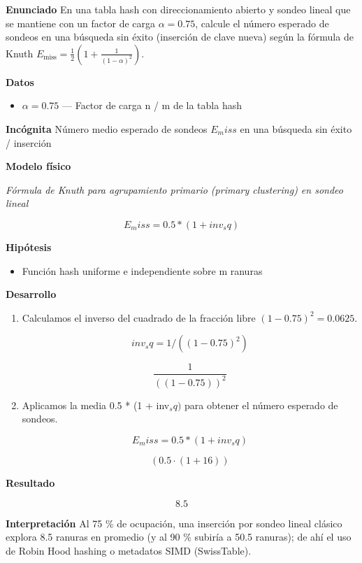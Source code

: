 \documentclass{book}
\begin{document}
\begin{tcolorbox}[title={Problema resuelto}, studiumworked, breakable]

\noindent\textbf{Enunciado}
En una tabla hash con direccionamiento abierto y sondeo lineal que se mantiene con un factor de carga \(\alpha = 0.75\), calcule el número esperado de sondeos en una búsqueda sin éxito (inserción de clave nueva) según la fórmula de Knuth \(E_{\text{miss}} = \frac{1}{2}\left(1 + \frac{1}{(1 - \alpha)^2}\right)\).

\noindent\textbf{Datos}
\begin{itemize}
\item $\alpha = 0.75$ — Factor de carga n / m de la tabla hash
\end{itemize}

\noindent\textbf{Incógnita}
Número medio esperado de sondeos \(E_miss\) en una búsqueda sin éxito / inserción

\noindent\textbf{Modelo físico}

\noindent\textit{Fórmula de Knuth para agrupamiento primario (primary clustering) en sondeo lineal}

\[
E_miss = 0.5 * (1 + inv_sq)
\]

\noindent\textbf{Hipótesis}
\begin{itemize}
\item Función hash uniforme e independiente sobre m ranuras
\end{itemize}

\noindent\textbf{Desarrollo}
\begin{enumerate}
\item
Calculamos el inverso del cuadrado de la fracción libre \((1 - 0.75)^2 = 0.0625\).

\[
inv_sq = 1 / ((1 - 0.75)^2)
\]

\[
\frac{1}{\left(\left(1-0.75\right)\right)^{2}}
\]
\item
Aplicamos la media 0.5 * (1 + inv\(_sq)\) para obtener el número esperado de sondeos.

\[
E_miss = 0.5 * (1 + inv_sq)
\]

\[
\left(0.5\cdot \left(1+16\right)\right)
\]
\end{enumerate}

\noindent\textbf{Resultado}

\[
8.5
\]

\noindent\textbf{Interpretación}
Al 75 \% de ocupación, una inserción por sondeo lineal clásico explora 8.5 ranuras en promedio (y al 90 \% subiría a 50.5 ranuras); de ahí el uso de Robin Hood hashing o metadatos SIMD (SwissTable).


\end{tcolorbox}
\end{document}
